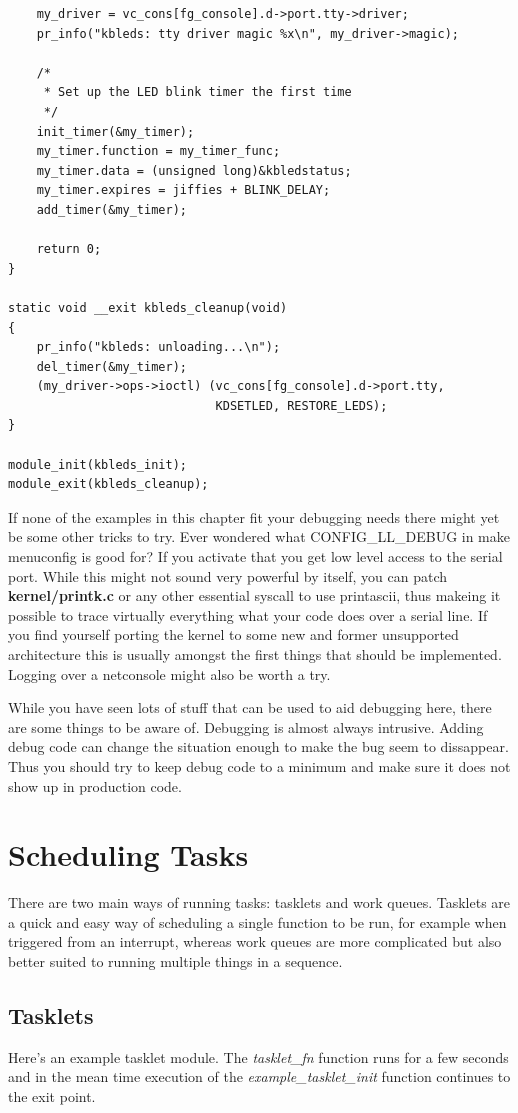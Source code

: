 \documentclass[11pt]{article}
\begin{document}
\begin{verbatim}
    my_driver = vc_cons[fg_console].d->port.tty->driver;
    pr_info("kbleds: tty driver magic %x\n", my_driver->magic);

    /*
     * Set up the LED blink timer the first time
     */
    init_timer(&my_timer);
    my_timer.function = my_timer_func;
    my_timer.data = (unsigned long)&kbledstatus;
    my_timer.expires = jiffies + BLINK_DELAY;
    add_timer(&my_timer);

    return 0;
}

static void __exit kbleds_cleanup(void)
{
    pr_info("kbleds: unloading...\n");
    del_timer(&my_timer);
    (my_driver->ops->ioctl) (vc_cons[fg_console].d->port.tty,
                             KDSETLED, RESTORE_LEDS);
}

module_init(kbleds_init);
module_exit(kbleds_cleanup);
\end{verbatim}

If none of the examples in this chapter fit your debugging needs there might yet be some other tricks to try. Ever wondered what CONFIG\_LL\_DEBUG in make menuconfig is good for? If you activate that you get low level access to the serial port. While this might not sound very powerful by itself, you can patch \textbf{kernel/printk.c} or any other essential syscall to use printascii, thus makeing it possible to trace virtually everything what your code does over a serial line. If you find yourself porting the kernel to some new and former unsupported architecture this is usually amongst the first things that should be implemented. Logging over a netconsole might also be worth a try.

While you have seen lots of stuff that can be used to aid debugging here, there are some things to be aware of. Debugging is almost always intrusive. Adding debug code can change the situation enough to make the bug seem to dissappear. Thus you should try to keep debug code to a minimum and make sure it does not show up in production code.

\section*{Scheduling Tasks}
\label{sec:orgcfa5bbc}
There are two main ways of running tasks: tasklets and work queues. Tasklets are a quick and easy way of scheduling a single function to be run, for example when triggered from an interrupt, whereas work queues are more complicated but also better suited to running multiple things in a sequence.

\subsection*{Tasklets}
\label{sec:orgc307748}
Here's an example tasklet module. The \emph{tasklet\_fn} function runs for a few seconds and in the mean time execution of the \emph{example\_tasklet\_init} function continues to the exit point.
\end{document}

